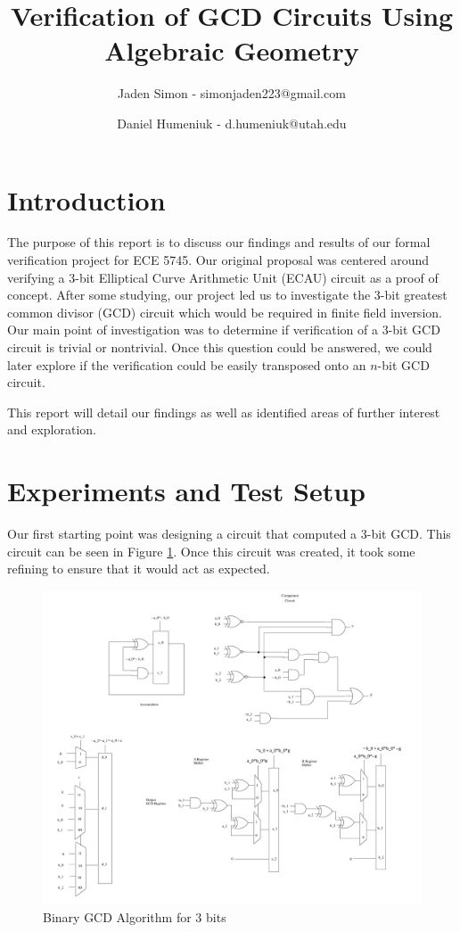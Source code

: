 \documentclass[12pt]{report}
\title{Verification of GCD Circuits Using Algebraic Geometry}
\author{Jaden Simon - simonjaden223@gmail.com \\ \and
	   Daniel Humeniuk - d.humeniuk@utah.edu}
\begin{document}
\maketitle

\section{Introduction}

The purpose of this report is to discuss our findings and results of our formal verification project for ECE 5745. Our original proposal was centered around verifying a 3-bit Elliptical Curve Arithmetic Unit (ECAU) circuit as a proof of concept. After some studying, our project led us to investigate the 3-bit greatest common divisor (GCD) circuit which would be required in finite field inversion. Our main point of investigation was to determine if verification of a 3-bit GCD circuit is trivial or nontrivial. Once this question could be answered, we could later explore if the verification could be easily transposed onto an $n$-bit GCD circuit.

This report will detail our findings as well as identified areas of further interest and exploration.

\section{Experiments and Test Setup}

Our first starting point was designing a circuit that computed a 3-bit GCD. This circuit can be seen in Figure \ref{fig:gcd}. Once this circuit was created, it took some refining to ensure that it would act as expected. 

\begin{figure}
\includegraphics[scale=0.125]{images/gcd.png}
\caption{Binary GCD Algorithm for $3$ bits}
\label{fig:gcd}
\end{figure}
\end{document}
